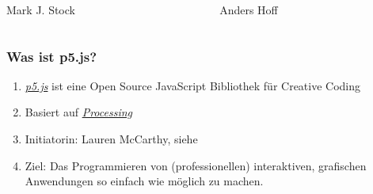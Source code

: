 \documentclass[aspectratio=169]{beamer}
\begin{document}
\begin{frame}
\begin{center}
\begin{columns}
\begin{column}{0.3\textwidth}
		Mark J. Stock
		\end{column}
		\hfill
		\begin{column}{0.3\textwidth}
		Anders Hoff
		\end{column}
	\end{columns}
	\end{center}
\end{frame}

\begin{frame}
	\frametitle{Was ist p5.js?}
	\begin{enumerate}[label=$\bullet$]
		\item \textit{\href{https://p5js.org/}{p5.js}} ist eine Open Source JavaScript Bibliothek für \alert{Creative Coding}
		\item Basiert auf \textit{\href{https://processing.org/}{Processing}}
		\item Initiatorin: Lauren McCarthy, siehe \cite{mccarthy:2015}
		\item \alert{Ziel}: Das Programmieren von (professionellen) interaktiven, grafischen Anwendungen so einfach wie möglich zu machen.
	\end{enumerate}
    
\end{frame}
\end{document}
